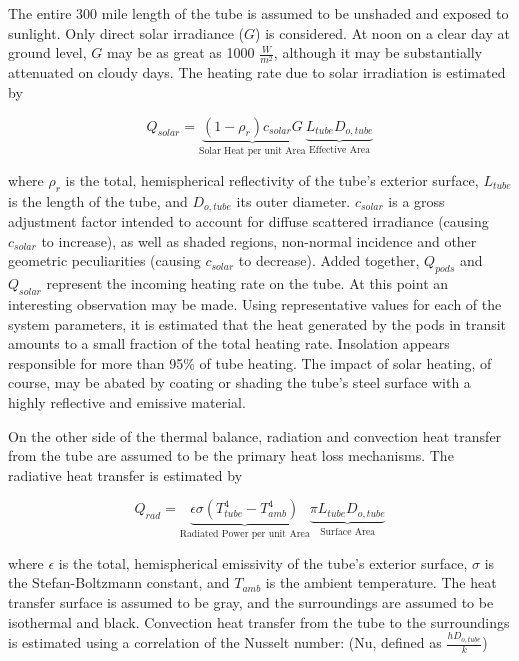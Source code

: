 \documentclass[heading.tex]{subfiles}
\begin{document}
The entire 300 mile length of the tube is assumed to be unshaded and exposed to sunlight.
Only direct solar irradiance ($G$) is considered.
At noon on a clear day at ground level, $G$ may be as great as 1000 $\frac{W}{m^{2}}$,
although it may be substantially attenuated on cloudy days.
The heating rate due to solar irradiation is estimated by

\begin{equation}
Q_{solar} = \underbrace{ (1- \rho_{r})  c_{solar}G}_\text{Solar Heat per unit Area} \underbrace{L_{tube}  D_{o,tube}}_\text{Effective Area}
\end{equation}


where $\rho_{r}$ is the total, hemispherical reflectivity of the tube's exterior surface,
$L_{tube}$ is the length of the tube, and $D_{o,tube}$ its outer diameter.
$c_{solar}$ is a gross adjustment factor intended to account for diffuse
scattered irradiance (causing $c_{solar}$ to increase), as well as shaded regions,
non-normal incidence and other geometric peculiarities (causing $c_{solar}$ to decrease).
Added together,
$Q_{pods}$ and $Q_{solar}$ represent the incoming heating rate on the tube.
At this point an interesting observation may be made.
Using representative values for each of the system parameters,
it is estimated that the heat generated by the pods in transit
amounts to a small fraction of the total heating rate.
Insolation appears responsible for more than 95\% of tube heating.
The impact of solar heating, of course, may be abated by coating
or shading the tube's steel surface with a highly reflective and emissive material.

On the other side of the thermal balance,
radiation and convection heat transfer from the tube are assumed
to be the primary heat loss mechanisms. The radiative heat transfer is estimated by

\begin{equation}
Q_{rad} = \underbrace{\epsilon \sigma (T_{tube}^4 - T_{amb}^4)}_\text{Radiated Power per unit Area}\underbrace{\pi L_{tube} D_{o,tube}}_\text{Surface Area}
\end{equation}

where $\epsilon$ is the total, hemispherical emissivity of the tube's exterior surface,
$\sigma$ is the Stefan-Boltzmann constant, and $T_{amb}$ is the ambient temperature.
The heat transfer surface is assumed to be gray,
and the surroundings are assumed to be isothermal and black.
Convection heat transfer from the tube to the surroundings is estimated using a
correlation of the Nusselt number: \cite{Churchill}
(Nu, defined as $\frac{hD_{o,tube}}{k}$)
\end{document}
